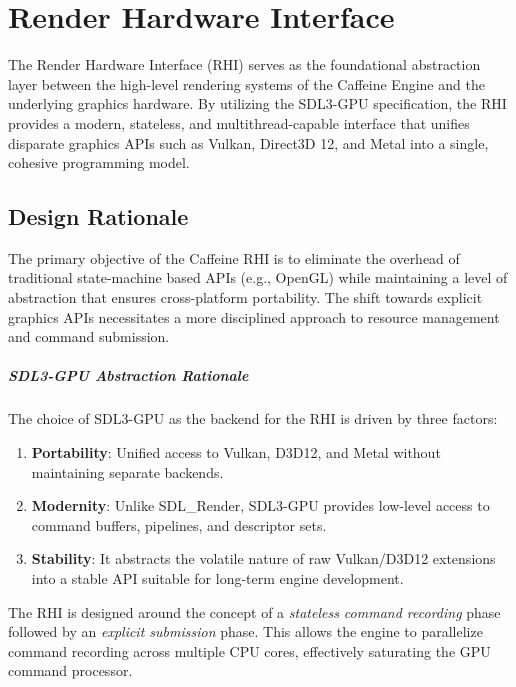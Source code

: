 \chapter{Render Hardware Interface}

The Render Hardware Interface (RHI) serves as the foundational abstraction layer between the high-level rendering systems of the Caffeine Engine and the underlying graphics hardware. By utilizing the SDL3-GPU specification, the RHI provides a modern, stateless, and multithread-capable interface that unifies disparate graphics APIs such as Vulkan, Direct3D 12, and Metal into a single, cohesive programming model.

\section{Design Rationale}

The primary objective of the Caffeine RHI is to eliminate the overhead of traditional state-machine based APIs (e.g., OpenGL) while maintaining a level of abstraction that ensures cross-platform portability. The shift towards explicit graphics APIs necessitates a more disciplined approach to resource management and command submission.


\paragraph{SDL3-GPU Abstraction Rationale}

The choice of SDL3-GPU as the backend for the RHI is driven by three factors:
\begin{enumerate}
    \item \textbf{Portability}: Unified access to Vulkan, D3D12, and Metal without maintaining separate backends.
    \item \textbf{Modernity}: Unlike SDL\_Render, SDL3-GPU provides low-level access to command buffers, pipelines, and descriptor sets.
    \item \textbf{Stability}: It abstracts the volatile nature of raw Vulkan/D3D12 extensions into a stable API suitable for long-term engine development.
\end{enumerate}



The RHI is designed around the concept of a \textit{stateless command recording} phase followed by an \textit{explicit submission} phase. This allows the engine to parallelize command recording across multiple CPU cores, effectively saturating the GPU command processor.

